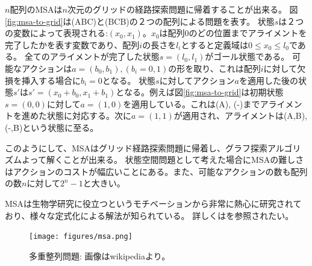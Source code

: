 $n$配列のMSAは$n$次元のグリッドの経路探索問題に帰着することが出来る\cite{korf:2000}。
図\ref{fig:msa-to-grid}は(ABC)と(BCB)の２つの配列による問題を表す。
状態$s$は２つの変数によって表現される:$(x_0, x_1)$。$x_0$は配列0のどの位置までアライメントを完了したかを表す変数であり、配列$i$の長さを$l_i$とすると定義域は$0 \leq x_0 \leq l_0$である。
全てのアライメントが完了した状態$s=(l_0, l_1)$がゴール状態である。
可能なアクションは$a=(b_0, b_1), (b_i=0, 1)$の形を取り、これは配列$i$に対して欠損を挿入する場合に$b_i=0$となる。
状態$s$に対してアクション$a$を適用した後の状態$s'$は$s'=(x_0+b_0, x_1+b_1)$となる。例えば図\ref{fig:msa-to-grid}は初期状態$s=(0,0)$に対して$a=(1,0)$を適用している。これは(A), (-)までアライメントを進めた状態に対応する。次に$a=(1,1)$が適用され、アライメントは(A,B), (-,B)という状態に至る。

このようにして、MSAはグリッド経路探索問題に帰着し、グラフ探索アルゴリズムよって解くことが出来る。
状態空間問題として考えた場合にMSAの難しさはアクションのコストが幅広いことにある。また、可能なアクションの数も配列の数$n$に対して$2^n-1$と大きい。

MSAは生物学研究に役立つというモチベーションから非常に熱心に研究されており、様々な定式化による解法が知られている。
詳しくは\cite{waterman1995introduction,
gusfield1997algorithms,edgar2006multiple}を参照されたい。


\begin{figure}
\centering
\texttt{[image: figures/msa.png]}
\caption{多重整列問題: 画像はwikipediaより。}
\label{fig:msa-gif}
\end{figure}


